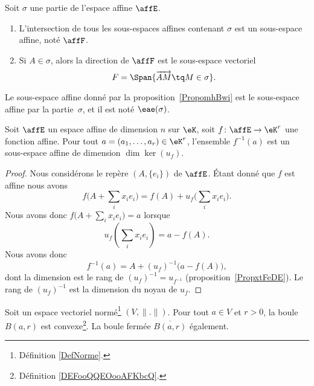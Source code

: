 \begin{proposition}      \label{PropomhBwi}
	Soit \( \sigma\) une partie de l'espace affine \( \affE\).
	\begin{enumerate}
		\item
		      L'intersection de tous les sous-espaces affines contenant \( \sigma\) est un sous-espace affine, noté \( \affF\).
		\item
		      Si \( A\in \sigma\), alors la direction de \( \affF\) est le sous-espace vectoriel
		      \begin{equation}        \label{EqnRAUfg}
			      F=\Span\{ \overrightarrow{ AM }\tq M\in \sigma \}.
		      \end{equation}
	\end{enumerate}
\end{proposition}
Le sous-espace affine donné par la proposition~\ref{PropomhBwi} est le sous-espace affine  par la partie~\( \sigma\), et il est noté \( \eae(\sigma)\). 

\begin{proposition}     \label{PROPooAKJBooMkmsiV}
	Soit \( \affE\) un espace affine de dimension \( n\) sur \( \eK\), soit \( f\colon \affE\to \eK^r\) une fonction affine. Pour tout \( a=(a_1,\ldots, a_r)\in \eK^r\), l'ensemble \( f^{-1}(a)\) est un sous-espace affine de dimension \( \dim\ker(u_f)\).
\end{proposition}

\begin{proof}
	Nous considérons le repère \( (A,\{ e_i \})\) de \( \affE\). Étant donné que \( f\) est affine nous avons
	\begin{equation}
		f\big( A+\sum_ix_ie_i \big)=f(A)+u_f\big( \sum_ix_ie_i \big).
	\end{equation}
	Nous avons donc \( f\big( A+\sum_ix_ie_i \big)=a\) lorsque
	\begin{equation}
		u_f(\sum_ix_ie_i)=a-f(A).
	\end{equation}
	Nous avons donc
	\begin{equation}
		f^{-1}(a)=A+(u_f)^{-1}\big( a-f(A) \big),
	\end{equation}
	dont la dimension est le rang de \( (u_f)^{-1}=u_{f^{-1}}\) (proposition~\ref{PropxtFeDE}). Le rang de \( (u_f)^{-1}\) est la dimension du noyau de \( u_f\).
\end{proof}

\begin{proposition}     \label{PROPooUQLUooDQfYLT}
	Soit un espace vectoriel normé\footnote{Définition \ref{DefNorme}.} \( (V,\| . \|)\). Pour tout \( a\in V\) et \( r>0\), la boule \( B(a,r)\) est convexe\footnote{Définition \ref{DEFooQQEOooAFKbcQ}.}. La boule fermée \( \overline{ B(a,r) }\) également.
\end{proposition}

